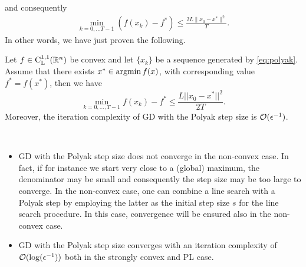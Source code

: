 \documentclass[10pt,a4paper]{article}
\begin{document}
and consequently 
\begin{align*}
	\min_{k=0, \dots T-1}(f(x_k) - f^*) \leq \frac{2L\|x_0-x^*\|^2}{T}.
\end{align*} 
\noindent In other words, we have just proven the following.
\begin{theorem}
	Let $f\in \mathord{\mathrm{C^{1,1}_{L}}}(\mathbb{R}^n)$ be convex and let $\{x_k\}$ be a sequence generated by \eqref{eq:polyak}. Assume that there exists $x^*\in \operatorname*{argmin} f(x)$, with corresponding value $f^*=f(x^*)$, then we have 
	\begin{equation}\label{eq:polyak_convergence}
		\min_{k=0, \dots, T-1} f(x_k)-f^* \leq \frac{L ||x_0-x^*||^2}{2T}.
	\end{equation}
Moreover, the iteration complexity of GD with the Polyak step size is $\mathcal{O}(\epsilon^{-1})$.
\end{theorem}
\begin{remark}$\;$\\
	\vspace{-5mm}
	\begin{itemize}
		\item GD with the Polyak step size does not converge in the non-convex case. In fact, if for instance we start very close to a (global) maximum, the denominator may be small and consequently the step size may be too large to converge. In the non-convex case, one can combine a line search with a Polyak step by employing the latter as the initial step size $s$ for the line search procedure. In this case, convergence will be ensured also in the non-convex case.
		\item GD with the Polyak step size converges with an iteration complexity of $\mathcal{O}(\log(\epsilon^{-1}))$ both in the strongly convex and PL case.
	\end{itemize}
	
	
\end{remark}
\end{document}
